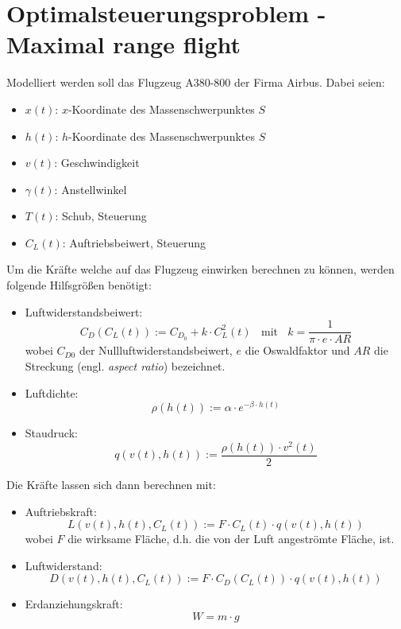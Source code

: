 \chapter{Optimalsteuerungsproblem - \glqq Maximal range flight\grqq{}} \label{cha:optim}

Modelliert werden soll das Flugzeug A380-800 der Firma Airbus. Dabei seien:
\begin{itemize}
    \item $x(t)$: $x$-Koordinate des Massenschwerpunktes $S$
    \item $h(t)$: $h$-Koordinate des Massenschwerpunktes $S$
    \item $v(t)$: Geschwindigkeit
    \item $\gamma(t)$: Anstellwinkel
    \item $T(t)$: Schub, Steuerung
    \item $C_L(t)$: Auftriebsbeiwert, Steuerung
\end{itemize}
Um die Kräfte welche auf das Flugzeug einwirken berechnen zu können, werden folgende Hilfsgrößen benötigt:
\begin{itemize}
    \item Luftwiderstandsbeiwert: \[C_D(C_L(t)) := C_{D_0} + k \cdot C^2_L(t) \ \ \ \ \text{mit} \ \ \ \ k = \dfrac{1}{\pi \cdot e \cdot AR}\] wobei $C_{D0}$ der Nullluftwiderstandsbeiwert, $e$ die Oswaldfaktor und $AR$ die Streckung (engl. \textit{aspect ratio}) bezeichnet.
    \item Luftdichte: \[\rho(h(t)) := \alpha \cdot e^{-\beta \cdot h(t)}\] %
    \item Staudruck: \[q(v(t), h(t)) := \dfrac{\rho(h(t)) \cdot v^2(t)}{2} \]
\end{itemize}
Die Kräfte lassen sich dann berechnen mit:
\begin{itemize}
    \item Auftriebskraft: \[L(v(t), h(t), C_L(t)) := F \cdot C_L(t) \cdot q(v(t), h(t))\] wobei $F$ die wirksame Fläche, d.h. die von der Luft angeströmte Fläche, ist.
    \item Luftwiderstand: \[D(v(t), h(t), C_L(t)) := F \cdot C_D(C_L(t)) \cdot q(v(t), h(t))\]
    \item Erdanziehungskraft: \[W = m \cdot g\]
\end{itemize}

